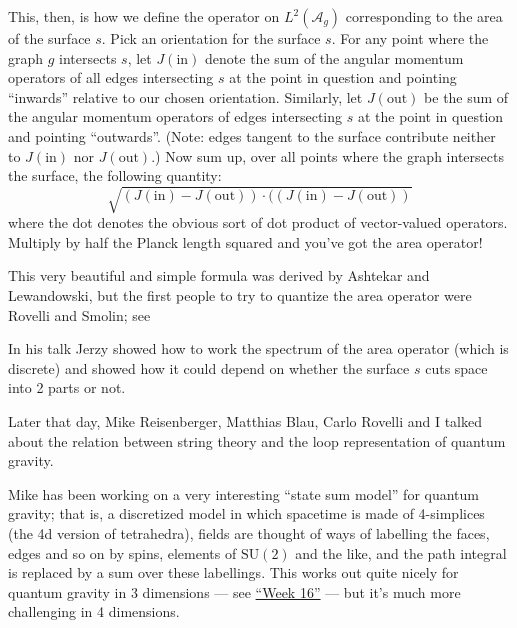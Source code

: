 \documentclass{article}
\renewcommand{\texttt}[1]{%
  \begingroup
  \ttfamily
  \begingroup\lccode`~=`/\lowercase{\endgroup\def~}{/\discretionary{}{}{}}%
  \begingroup\lccode`~=`[\lowercase{\endgroup\def~}{[\discretionary{}{}{}}%
  \begingroup\lccode`~=`.\lowercase{\endgroup\def~}{.\discretionary{}{}{}}%
  \catcode`/=\active\catcode`[=\active\catcode`.=\active
  \scantokens{#1\noexpand}%
  \endgroup
}
\begin{document}
\begin{itemize}
  This, then, is how we define the operator on \(L^2(\mathcal{A}_g)\)
  corresponding to the area of the surface \(s\). Pick an orientation
  for the surface \(s\). For any point where the graph \(g\) intersects
  \(s\), let \(J(\mathrm{in})\) denote the sum of the angular momentum
  operators of all edges intersecting \(s\) at the point in question and
  pointing ``inwards'' relative to our chosen orientation. Similarly,
  let \(J(\mathrm{out})\) be the sum of the angular momentum operators
  of edges intersecting \(s\) at the point in question and pointing
  ``outwards''. (Note: edges tangent to the surface contribute neither
  to \(J(\mathrm{in})\) nor \(J(\mathrm{out})\).) Now sum up, over all
  points where the graph intersects the surface, the following quantity:
  \[\sqrt{(J(\mathrm{in})-J(\mathrm{out})) \cdot ((J(\mathrm{in})-J(\mathrm{out}))}\]
  where the dot denotes the obvious sort of dot product of vector-valued
  operators. Multiply by half the Planck length squared and you've got
  the area operator!

  This very beautiful and simple formula was derived by Ashtekar and
  Lewandowski, but the first people to try to quantize the area operator
  were Rovelli and Smolin; see


  In his talk Jerzy showed how to work the spectrum of the area operator
  (which is discrete) and showed how it could depend on whether the
  surface \(s\) cuts space into 2 parts or not.

  Later that day, Mike Reisenberger, Matthias Blau, Carlo Rovelli and I
  talked about the relation between string theory and the loop
  representation of quantum gravity.

  Mike has been working on a very interesting ``state sum model'' for
  quantum gravity; that is, a discretized model in which spacetime is
  made of 4-simplices (the 4d version of tetrahedra), fields are thought
  of ways of labelling the faces, edges and so on by spins, elements of
  \(\mathrm{SU}(2)\) and the like, and the path integral is replaced by
  a sum over these labellings. This works out quite nicely for quantum
  gravity in 3 dimensions --- see \protect\hyperlink{week16}{``Week
  16''} --- but it's much more challenging in 4 dimensions.


\end{itemize}
\end{document}
